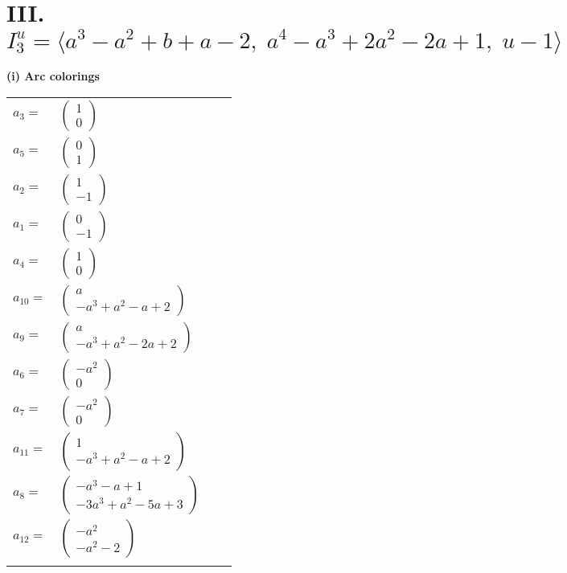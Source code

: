 \documentclass[1p]{elsarticle_modified}
\theoremstyle{definition}
\begin{document}
\centering \section*{III. $I^u_{3}= \langle a^3- a^2+b+a-2,\;a^4- a^3+2 a^2-2 a+1,\;u-1 \rangle$}
\flushleft \textbf{(i) Arc colorings}\\
\begin{tabular}{m{7pt} m{180pt} m{7pt} m{180pt} }
\flushright $a_{3}=$&$\begin{pmatrix}1\\0\end{pmatrix}$ \\
\flushright $a_{5}=$&$\begin{pmatrix}0\\1\end{pmatrix}$ \\
\flushright $a_{2}=$&$\begin{pmatrix}1\\-1\end{pmatrix}$ \\
\flushright $a_{1}=$&$\begin{pmatrix}0\\-1\end{pmatrix}$ \\
\flushright $a_{4}=$&$\begin{pmatrix}1\\0\end{pmatrix}$ \\
\flushright $a_{10}=$&$\begin{pmatrix}a\\- a^3+a^2- a+2\end{pmatrix}$ \\
\flushright $a_{9}=$&$\begin{pmatrix}a\\- a^3+a^2-2 a+2\end{pmatrix}$ \\
\flushright $a_{6}=$&$\begin{pmatrix}- a^2\\0\end{pmatrix}$ \\
\flushright $a_{7}=$&$\begin{pmatrix}- a^2\\0\end{pmatrix}$ \\
\flushright $a_{11}=$&$\begin{pmatrix}1\\- a^3+a^2- a+2\end{pmatrix}$ \\
\flushright $a_{8}=$&$\begin{pmatrix}- a^3- a+1\\-3 a^3+a^2-5 a+3\end{pmatrix}$ \\
\flushright $a_{12}=$&$\begin{pmatrix}- a^2\\- a^2-2\end{pmatrix}$\\&\end{tabular}
\end{document}
